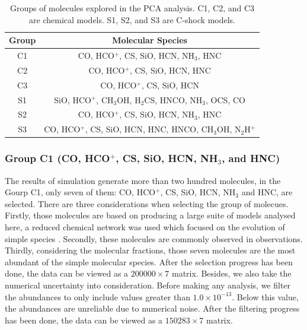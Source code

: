 \documentclass{aa}
\begin{document}
\begin{CJK*}{UTF8}{gbsn}
  \begin{table}[htbp]
\centering
\begin{tabular}{ccccccccc}
\hline\hline
Group & \multicolumn{8}{c}{Molecular Species}                         \\ \hline
C1    & \multicolumn{8}{c}{CO, HCO$^+$, CS, SiO, HCN, NH$_3$, HNC}          \\
C2    & \multicolumn{8}{c}{CO, HCO$^+$, CS, SiO, HCN, HNC}         \\
C3    & \multicolumn{8}{c}{CO, HCO$^+$, CS, SiO, HCN}         \\
S1    & \multicolumn{8}{c}{SiO, HCO$^+$, CH$_3$OH, H$_2$CS, HNCO, NH$_3$, OCS, CO} \\
S2    & \multicolumn{8}{c}{CO, HCO$^+$, CS, SiO, HCN, NH$_3$, HNC}         \\
S3    & \multicolumn{8}{c}{CO, HCO$^+$, CS, SiO, HCN, HNC, HNCO, CH$_3$OH, N$_2$H$^+$}      \\
\hline\hline
\end{tabular}
\caption{Groups of molecules explored in the PCA analysis. C1, C2, and C3 are chemical models. S1, S2, and S3 are C-shock models.}
\label{tab:molegroups}
\end{table}

  
  
\subsubsection{Group C1 (CO, HCO$^+$, CS, SiO, HCN, NH$_3$, and HNC)}
   
  The results of simulation generate more than two hundred molecules, in the Gourp C1, only seven of them: 
  CO, HCO$^+$, CS, SiO, HCN, NH$_3$ and HNC, are selected. 
  There are three considerations when selecting the group of molecues.  
  Firstly, those molecules are based on producing a large suite of models analysed here, a reduced chemical network was used which focused on the evolution of simple species \citep{holdship2017uclchem}. 
  Secondly, these molecules are commonly observed in observations. 
  Thirdly, considering the molecular fractions, those seven molecules are the most abundant of the simple molecular species. 
  After the selection progress has been done, the data can be viewed as a $200000\times7$ matrix. 
  Besides, we also take the numerical uncertainty into consideration. 
  Before making any analysis, we filter the abundances to only include values greater than $1.0\times10^{-13}$. 
  Below this value, the abundances are unreliable due to numerical noise. 
  After the filtering progress has been done, the data can be viewed as a $150283\times7$ matrix.  
  

\end{CJK*}
\end{document}
